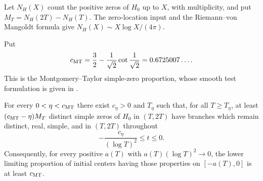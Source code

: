 Let $N_H(X)$ count the positive zeros of $H_0$ up to $X$, with multiplicity, and put $M_T=N_H(2T)-N_H(T)$. The zero-location input and the Riemann--von Mangoldt formula give
$N_H(X)\sim X\log X/(4\pi)$.

Put
\[
 c_{\rm MT}=\frac32-\frac1{\sqrt2}\cot\frac1{\sqrt2}
            =0.6725007\ldots.
\]
This is the Montgomery--Taylor simple-zero proportion, whose smooth
test formulation is given in \cite[Lemma~3.2, pp.~13--15]{lamzouri-simple2026}.

\begin{theorem}\label{thm:two-thirds-survival}
For every $0<\eta<c_{\rm MT}$ there exist $c_\eta>0$ and $T_\eta$ such that, for all $T\ge T_\eta$, at least $(c_{\rm MT}-\eta)M_T$ distinct simple zeros of $H_0$ in $(T,2T)$ have branches which remain distinct, real, simple, and in $(T,2T)$ throughout
\[
                  -\frac{c_\eta}{(\log T)^2}\le t\le0.
\]
Consequently, for every positive $a(T)$ with $a(T)(\log T)^2\to0$, the lower limiting proportion of initial centers having those properties on $[-a(T),0]$ is at least $c_{\rm MT}$.
\end{theorem}
